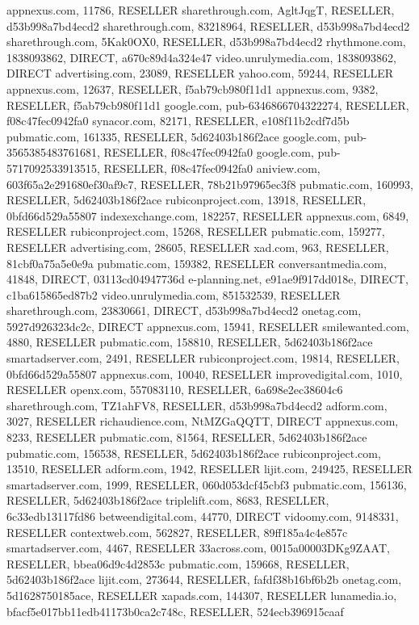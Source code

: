 appnexus.com, 11786, RESELLER
sharethrough.com, AgltJqgT, RESELLER, d53b998a7bd4ecd2
sharethrough.com, 83218964, RESELLER, d53b998a7bd4ecd2
sharethrough.com, 5Kak0OX0, RESELLER, d53b998a7bd4ecd2
rhythmone.com, 1838093862, DIRECT, a670c89d4a324e47
video.unrulymedia.com, 1838093862, DIRECT
advertising.com, 23089, RESELLER
yahoo.com, 59244, RESELLER
appnexus.com, 12637, RESELLER, f5ab79cb980f11d1
appnexus.com, 9382, RESELLER, f5ab79cb980f11d1
google.com, pub-6346866704322274, RESELLER, f08c47fec0942fa0
synacor.com, 82171, RESELLER, e108f11b2cdf7d5b
pubmatic.com, 161335, RESELLER, 5d62403b186f2ace
google.com, pub-3565385483761681, RESELLER, f08c47fec0942fa0
google.com, pub-5717092533913515, RESELLER, f08c47fec0942fa0
aniview.com, 603f65a2e291680ef30af9c7, RESELLER, 78b21b97965ec3f8
pubmatic.com, 160993, RESELLER, 5d62403b186f2ace
rubiconproject.com, 13918, RESELLER, 0bfd66d529a55807
indexexchange.com, 182257, RESELLER
appnexus.com, 6849, RESELLER
rubiconproject.com, 15268, RESELLER
pubmatic.com, 159277, RESELLER
advertising.com, 28605, RESELLER
xad.com, 963, RESELLER, 81cbf0a75a5e0e9a
pubmatic.com, 159382, RESELLER
conversantmedia.com, 41848, DIRECT, 03113cd04947736d
e-planning.net, e91ae9f917dd018e, DIRECT, c1ba615865ed87b2
video.unrulymedia.com, 851532539, RESELLER
sharethrough.com, 23830661, DIRECT, d53b998a7bd4ecd2
onetag.com, 5927d926323dc2c, DIRECT
appnexus.com, 15941, RESELLER
smilewanted.com, 4880, RESELLER
pubmatic.com, 158810, RESELLER, 5d62403b186f2ace
smartadserver.com, 2491, RESELLER
rubiconproject.com, 19814, RESELLER, 0bfd66d529a55807
appnexus.com, 10040, RESELLER
improvedigital.com, 1010, RESELLER
openx.com, 557083110, RESELLER, 6a698e2ec38604c6
sharethrough.com, TZ1ahFV8, RESELLER, d53b998a7bd4ecd2
adform.com, 3027, RESELLER
richaudience.com, NtMZGaQQTT, DIRECT
appnexus.com, 8233, RESELLER
pubmatic.com, 81564, RESELLER, 5d62403b186f2ace
pubmatic.com, 156538, RESELLER, 5d62403b186f2ace
rubiconproject.com, 13510, RESELLER
adform.com, 1942, RESELLER
lijit.com, 249425, RESELLER
smartadserver.com, 1999, RESELLER, 060d053dcf45cbf3
pubmatic.com, 156136, RESELLER, 5d62403b186f2ace
triplelift.com, 8683, RESELLER, 6c33edb13117fd86
betweendigital.com, 44770, DIRECT
vidoomy.com, 9148331, RESELLER
contextweb.com, 562827, RESELLER, 89ff185a4c4e857c
smartadserver.com, 4467, RESELLER
33across.com, 0015a00003DKg9ZAAT, RESELLER, bbea06d9c4d2853c
pubmatic.com, 159668, RESELLER, 5d62403b186f2ace
lijit.com, 273644, RESELLER, fafdf38b16bf6b2b
onetag.com, 5d1628750185ace, RESELLER
xapads.com, 144307, RESELLER
lunamedia.io, bfacf5e017bb11edb41173b0ca2c748c, RESELLER, 524ecb396915caaf
